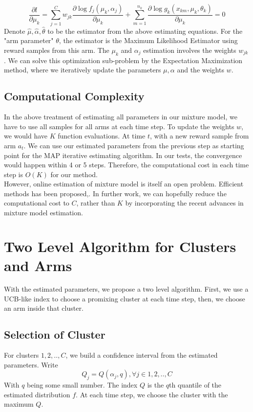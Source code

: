 \documentclass{article}
\begin{document}
\begin{equation}
\frac{\partial l}{\partial \mu_k} = \sum\limits_{j=1}^C w_{jk} \frac{\partial \log f_j(\mu_k,\alpha_j)}{\partial \mu_k} + \sum\limits_{m=1}^{n_k} \frac{\partial \log g_k(x_{km},\mu_k,\theta_k)}{\partial \mu_k} = 0
\end{equation}
Denote $\hat{\mu},\hat{\alpha},\hat{\theta}$ to be the estimator from the above estimating equations. For the "arm parameter" $\theta$, the estimator is the Maximum Likelihood Estimator using reward samples from this arm. The $\mu_k$ and $\alpha_j$ estimation involves the weights $w_{jk}$. We can solve this optimization sub-problem by the Expectation Maximization method, where we iteratively update the parameters $\mu,\alpha$ and the weights $w$.

\subsection{Computational Complexity}
In the above treatment of estimating all parameters in our mixture model, we have to use all samples for all arms at each time step. To update the weights $w$, we would have $K$ function evaluations. At time $t$, with a new reward sample from arm $a_t$. We can use our estimated parameters from the previous step as starting point for the MAP iterative estimating algorithm. In our tests, the convergence would happen within 4 or 5 steps. Therefore, the computational cost in each time step is $O(K)$ for our method. \\
However, online estimation of mixture model is itself an open problem. Efficient methods has been proposed\citep{lin},\citep{onlinemixture}. In further work, we can hopefully reduce the computational cost to $C$, rather than $K$ by incorporating the recent advances in mixture model estimation.

\section{  Two Level Algorithm for Clusters and Arms  }
With the estimated parameters, we propose a two level algorithm. First, we use a UCB-like index to choose a promixing cluster at each time step, then, we choose an arm inside that cluster. 
\subsection{Selection of Cluster}
For clusters $1,2,..,C$, we build a confidence interval from the estimated parameters. Write 
\begin{equation}
Q_j = Q(\alpha_j,q),\forall j\in 1,2,..,C
\end{equation}
With $q$ being some small number. The index $Q$ is the $q$th quantile of the estimated distribution $f$. At each time step, we choose the cluster with the maximum $Q$.
\end{document}
